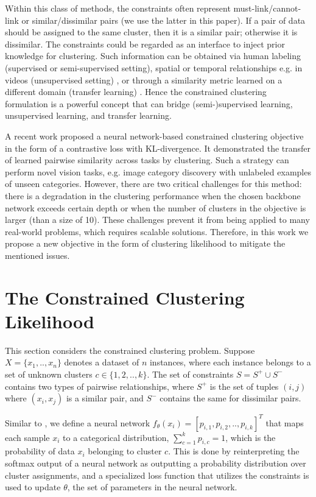 \documentclass[10pt,twocolumn,letterpaper]{article}
\newcommand{\ZK}[1]{}
\begin{document}
Within this class of methods, the constraints often represent must-link/cannot-link or similar/dissimilar pairs (we use the latter in this paper). If a pair of data should be assigned to the same cluster, then it is a similar pair; otherwise it is dissimilar. The constraints could be regarded as an interface to inject prior knowledge for clustering. Such information can be obtained via human labeling (supervised or semi-supervised setting), spatial or temporal relationships e.g. in videos (unsupervised setting) \cite{Osep17arXiv}, or through a similarity metric learned on a different domain (transfer learning) \cite{Hsu18iclr}. Hence the constrained clustering formulation is a powerful concept that can bridge (semi-)supervised learning, unsupervised learning, and transfer learning.

A recent work \cite{Hsu18iclr} proposed a neural network-based constrained clustering objective in the form of a contrastive loss with KL-divergence. It demonstrated the transfer of learned pairwise similarity across tasks by clustering. Such a strategy can perform novel vision tasks, e.g. image category discovery with unlabeled examples of unseen categories. However, there are two critical challenges for this method: there is a degradation in the clustering performance when the chosen backbone network exceeds certain depth or when the number of clusters in the objective is larger (than a size of 10). These challenges prevent it from being applied to many real-world problems, which requires scalable solutions. Therefore, in this work we propose a new objective in the form of clustering likelihood to mitigate the mentioned issues.
\ZK{Might be hard to do space-wise but would be nice if intro included major contributions, or at least a sentence describing what we propose}
\section{The Constrained Clustering Likelihood}

This section considers the constrained clustering problem. Suppose $X=\{x_1,..,x_n\}$ denotes a dataset of $n$ instances, where each instance belongs to a set of unknown clusters $c\in\{1,2,..,k\}$. The set of constraints $S=S^+ \cup S^-$ contains two types of pairwise relationships, where $S^+$ is the set of tuples $(i,j)$ where $(x_i,x_j)$ is a similar pair, and $S^-$ contains the same for dissimilar pairs.

Similar to \cite{Hsu16iclrw,Hsu18iclr}, we define a neural network $f_\theta(x_i)=[p_{i,1},p_{i,2},..,p_{i,k}]^T$ that maps each sample $x_i$ to a categorical distribution, \ie $\sum_{c=1}^k{p_{i,c}}=1$, which is the probability of data $x_i$ belonging to cluster $c$. This is done by reinterpreting the softmax output of a neural network as outputting a probability distribution over cluster assignments, and a specialized loss function that utilizes the constraints is used to update $\theta$, the set of parameters in the neural network.
\end{document}
